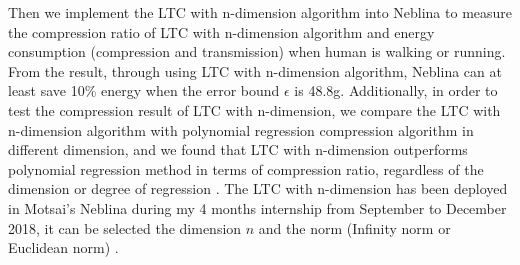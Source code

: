 Then we implement the LTC with n-dimension algorithm into Neblina to measure the
compression ratio of LTC with n-dimension algorithm and energy consumption
(compression and transmission) when human is walking or running. From the
result, through using LTC with n-dimension algorithm, Neblina can at least save
10\% energy when the error bound $\epsilon$ is 48.8g. Additionally, in order to
test the compression result of LTC with n-dimension, we compare the LTC with
n-dimension algorithm with polynomial regression compression algorithm in
different dimension, and we found that LTC with n-dimension outperforms
polynomial regression method in terms of compression ratio, regardless of the
dimension or degree of regression .
The LTC with n-dimension has been deployed in Motsai's Neblina during my 4
months internship from September to December 2018, it can be selected the
dimension $n$ and the norm (Infinity norm or Euclidean norm) .


% 
% 





